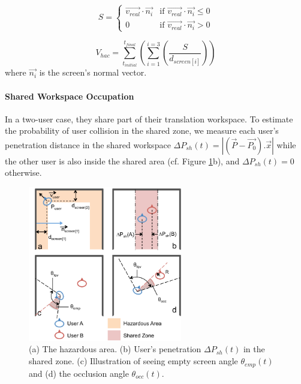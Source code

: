 \begin{equation}
S = 
  \begin{cases}
  \overrightarrow{v_{real}}\cdot\overrightarrow{n_{i}} & \text{if } \overrightarrow{v_{real}}\cdot\overrightarrow{n_{i}} \leq 0 \\
  0 & \text{if } \overrightarrow{v_{real}}\cdot\overrightarrow{n_{i}} > 0
  \end{cases}
\end{equation}

\begin{equation}
V_{hac}=\sum_{t_{initial}}^{t_{final}}\left(\sum_{i=1}^{i=3}\left(\frac{S}{d_{screen[i]}}\right)\right)
\end{equation}
where $\overrightarrow{n_{i}}$ is the screen's normal vector.


\paragraph{\textbf{Shared Workspace Occupation}}
In a two-user case, they share part of their translation workspace. To estimate the probability of user collision in the shared zone, we measure each user's penetration distance in the shared workspace $\Delta P_{sh}(t)=\left|(\overrightarrow{P}-\overrightarrow{P_{0}}).\overrightarrow{x}\right|$ while the other user is also inside the shared area (cf. Figure \ref{fig:3_metrics}b), and $\Delta P_{sh}(t)=0$ otherwise.

\begin{figure}[tb]
  \centering
  \includegraphics[width=0.6\textwidth]{figures/ch3/cohab_metrics}
  \caption{\label{fig:3_metrics}(a) The hazardous area. (b) User's penetration $\Delta P_{sh}(t)$ in the shared zone. (c) Illustration of seeing empty screen angle $\theta_{emp}(t)$ and (d) the occlusion angle $\theta_{occ}(t)$.}
\end{figure}


